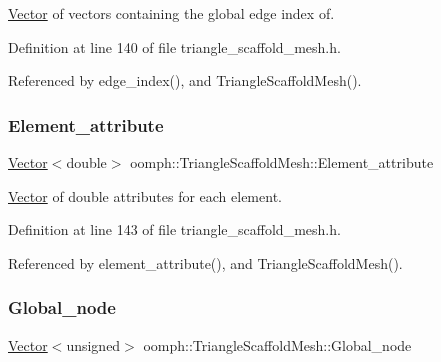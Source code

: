 \hyperlink{classoomph_1_1Vector}{Vector} of vectors containing the global edge index of. 



Definition at line 140 of file triangle\+\_\+scaffold\+\_\+mesh.\+h.



Referenced by edge\+\_\+index(), and Triangle\+Scaffold\+Mesh().

\mbox{\label{classoomph_1_1TriangleScaffoldMesh_a5eefdeebf6e15c37bf5bc5e8cf89242a}} 
\subsubsection{\texorpdfstring{Element\+\_\+attribute}{Element\_attribute}}
{\footnotesize\ttfamily \hyperlink{classoomph_1_1Vector}{Vector}$<$double$>$ oomph\+::\+Triangle\+Scaffold\+Mesh\+::\+Element\+\_\+attribute\hspace{0.3cm}{\ttfamily [protected]}}



\hyperlink{classoomph_1_1Vector}{Vector} of double attributes for each element. 



Definition at line 143 of file triangle\+\_\+scaffold\+\_\+mesh.\+h.



Referenced by element\+\_\+attribute(), and Triangle\+Scaffold\+Mesh().

\mbox{\label{classoomph_1_1TriangleScaffoldMesh_a3431de685a5eb8989e9bbc47891ebde2}} 
\subsubsection{\texorpdfstring{Global\+\_\+node}{Global\_node}}
{\footnotesize\ttfamily \hyperlink{classoomph_1_1Vector}{Vector}$<$unsigned$>$ oomph\+::\+Triangle\+Scaffold\+Mesh\+::\+Global\+\_\+node\hspace{0.3cm}{\ttfamily [protected]}}



